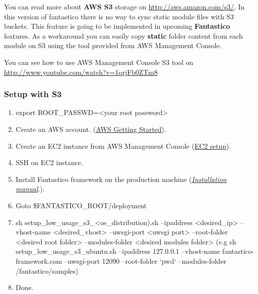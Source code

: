 \documentclass[letterpaper,10pt,english]{sphinxmanual}
\begin{document}
You can read more about \textbf{AWS S3} storage on \href{http://aws.amazon.com/s3/}{http://aws.amazon.com/s3/}. In this version of fantastico there is no
way to sync static module files with S3 buckets. This feature is going to be implemented in upcoming \textbf{Fantastico}
features. As a workaround you can easily copy \textbf{static} folder content from each module on S3 using the tool
provided from AWS Management Console.

You can see how to use AWS Management Console S3 tool on \href{http://www.youtube.com/watch?v=1qrjFb0ZTm8}{http://www.youtube.com/watch?v=1qrjFb0ZTm8}


\subsubsection{Setup with S3}
\label{how_to/deployment/aws_low_usage_scenario:setup-with-s3}\begin{enumerate}
\item {} 
export ROOT\_PASSWD=\textless{}your root password\textgreater{}

\item {} 
Create an AWS account. (\href{http://aws.amazon.com/documentation/gettingstarted/}{AWS Getting Started}).

\item {} 
Create an EC2 instance from AWS Management Console (\href{http://www.youtube.com/watch?v=WBro0TEAd7g}{EC2 setup}).

\item {} 
SSH on EC2 instance.

\item {} 
Install Fantastico framework on the production machine ({\hyperref[get_started/installation::doc]{\emph{Installation manual}}}.).

\item {} 
Goto \$FANTASTICO\_ROOT/deployment

\item {} 
sh setup\_low\_usage\_s3\_\textless{}os\_distribution).sh --ipaddress \textless{}desired\_ip\textgreater{} --vhost-name \textless{}desired\_vhost\textgreater{} --uwsgi-port \textless{}uwsgi port\textgreater{} --root-folder \textless{}desired root folder\textgreater{} --modules-folder \textless{}desired modules folder\textgreater{} (e.g sh setup\_low\_usage\_s3\_ubuntu.sh --ipaddress 127.0.0.1 --vhost-name fantastico-framework.com --uwsgi-port 12090 --root-folder {}`pwd{}` --modules-folder /fantastico/samples)

\item {} 
Done.

\end{enumerate}
\end{document}
